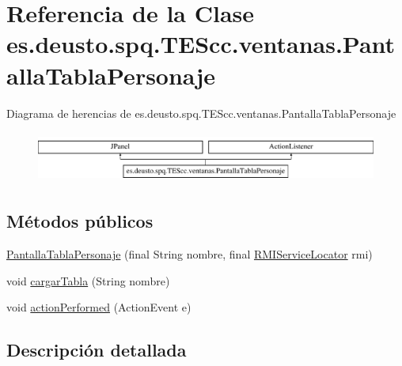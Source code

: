 \hypertarget{classes_1_1deusto_1_1spq_1_1_t_e_scc_1_1ventanas_1_1_pantalla_tabla_personaje}{\section{Referencia de la Clase es.\+deusto.\+spq.\+T\+E\+Scc.\+ventanas.\+Pantalla\+Tabla\+Personaje}
\label{classes_1_1deusto_1_1spq_1_1_t_e_scc_1_1ventanas_1_1_pantalla_tabla_personaje}
}
Diagrama de herencias de es.\+deusto.\+spq.\+T\+E\+Scc.\+ventanas.\+Pantalla\+Tabla\+Personaje\begin{figure}[H]
\begin{center}
\leavevmode
\includegraphics[height=1.696970cm]{classes_1_1deusto_1_1spq_1_1_t_e_scc_1_1ventanas_1_1_pantalla_tabla_personaje}
\end{center}
\end{figure}
\subsection*{Métodos públicos}
\begin{DoxyCompactItemize}
\item 
\hyperlink{classes_1_1deusto_1_1spq_1_1_t_e_scc_1_1ventanas_1_1_pantalla_tabla_personaje_aa490f3af2ab75ac457215a0a758f2066}{Pantalla\+Tabla\+Personaje} (final String nombre, final \hyperlink{classes_1_1deusto_1_1spq_1_1_t_e_scc_1_1cliente_1_1_r_m_i_service_locator}{R\+M\+I\+Service\+Locator} rmi)
\item 
void \hyperlink{classes_1_1deusto_1_1spq_1_1_t_e_scc_1_1ventanas_1_1_pantalla_tabla_personaje_ada0536b3ede4ad73cce3df47dd2cbb40}{cargar\+Tabla} (String nombre)
\item 
void \hyperlink{classes_1_1deusto_1_1spq_1_1_t_e_scc_1_1ventanas_1_1_pantalla_tabla_personaje_a12edf34b8d4e96e71434c213e18b105e}{action\+Performed} (Action\+Event e)
\end{DoxyCompactItemize}


\subsection{Descripción detallada}


